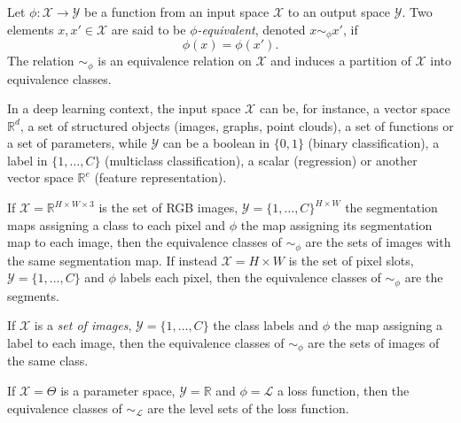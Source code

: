 \documentclass[mathematics,review,submit,moreauthors]{Definitions/mdpi}
\begin{document}
\begin{Definition}\label{def:equivalence}
    Let $\phi: \mathcal{X} \to \mathcal{Y}$ be a function from an input space $\mathcal{X}$ to an output space $\mathcal{Y}$.
    Two elements $x, x' \in \mathcal{X}$ are said to be \emph{$\phi$-equivalent}, denoted $x \sim_{\phi} x'$, if
    \[
        \phi(x) = \phi(x').
    \]
    The relation $\sim_{\phi}$ is an equivalence relation on $\mathcal{X}$ and induces a partition of $\mathcal{X}$ into equivalence classes.
\end{Definition}

In a deep learning context, the input space $\mathcal{X}$ can be, for instance, a vector space $\mathbb{R}^d$, a set of structured objects (images, graphs, point clouds), a set of functions or a set of parameters, while $\mathcal{Y}$ can be a boolean in $\{0,1\}$ (binary classification), a label in $\{1,\dots,C\}$ (multiclass classification), a scalar (regression) or another vector space $\mathbb{R}^e$ (feature representation).

\begin{Example}\label{ex:image-segmentation}
    If $\mathcal{X}=\mathbb{R}^{H\times W\times 3}$ is the set of RGB images, $\mathcal{Y}=\{1,\dots,C\}^{H\times W}$ the segmentation maps assigning a class to each pixel and $\phi$ the map assigning its segmentation map to each image, then the equivalence classes of $\sim_\phi$ are the sets of images with the same segmentation map.
    If instead $\mathcal{X}=H\times W$ is the set of pixel slots, $\mathcal{Y} = \{1,\dots,C\}$ and $\phi$ labels each pixel, then the equivalence classes of $\sim_\phi$ are the segments.
\end{Example}

\begin{Example}\label{ex:image-classification}
    If $\mathcal{X}$ is a \emph{set of images}, $\mathcal{Y} = \{1,\dots,C\}$ the class labels and $\phi$ the map assigning a label to each image, then the equivalence classes of $\sim_\phi$ are the sets of images of the same class.
\end{Example}

\begin{Example}
    If $\mathcal{X}=\Theta$ is a parameter space, $\mathcal{Y} = \mathbb{R}$ and $\phi=\mathcal{L}$ a loss function, then the equivalence classes of $\sim_{\mathcal{L}}$ are the level sets of the loss function.
\end{Example}
\end{document}

